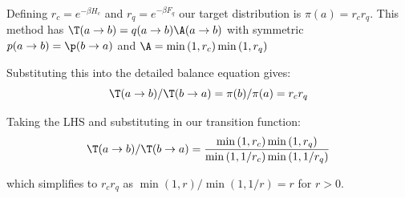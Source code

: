 \begin{Shaded}
\begin{Highlighting}[]
\OperatorTok{=}

 
\OperatorTok{=}

\OperatorTok{=}
  \NormalTok{,}\NormalTok{) }\OperatorTok{\textless{}}\OperatorTok{{-}}\OperatorTok{*}
\OperatorTok{=}
    \NormalTok{,}\NormalTok{) }\OperatorTok{\textless{}}\OperatorTok{{-}}\OperatorTok{*}
\OperatorTok{=}

\OperatorTok{=}
\end{Highlighting}
\end{Shaded}

Defining \(r_c = e^{-\beta H_c}\) and \(r_q = e^{-\beta F_q}\) our target distribution is \(\pi(a) = r_c r_q\). This method has \(\T(a\to b) = q(a\to b)\A(a \to b)\) with symmetric \(p(a \to b) = \p(b \to a)\) and \(\A = \min\left(1, r_c\right) \min\left(1, r_q\right)\)

Substituting this into the detailed balance equation gives: \[\T(a \to b)/\T(b \to a) = \pi(b)/\pi(a) = r_c r_q\]

Taking the LHS and substituting in our transition function: \[\begin{aligned}
\T(a \to b)/\T(b \to a) = \frac{\min\left(1, r_c\right) \min\left(1, r_q\right)}{ \min\left(1, 1/r_c\right) \min\left(1, 1/r_q\right)}\end{aligned}\]

which simplifies to \(r_c r_q\) as \(\min(1,r)/\min(1,1/r) = r\) for \(r > 0\).

\begin{Shaded}
\begin{Highlighting}[]

\end{Highlighting}
\end{Shaded}
